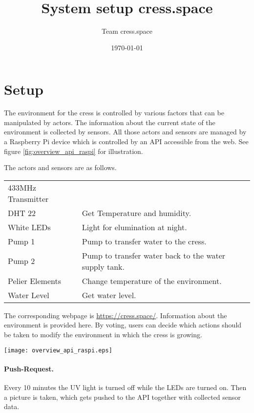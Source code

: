\documentclass[twocolumn,a4wide,parskip,10pt]{scrartcl}
\title{System setup cress.space}
\date{\today}
\author{Team cress.space}
\begin{document}
\maketitle
\setcounter{page}{1}

\section{Setup}

The environment for the cress is controlled by various factors that
can be manipulated by actors. The information about the current state
of the environment is collected by sensors. All those actors and
sensors are managed by a Raspberry Pi device which is controlled by an
API accessible from the web. See figure \ref{fig:overview_api_raspi}
for illustration.

The actors and sensors are as follows.

\begin{tabular}{p{2.5cm}p{4cm}}
  433MHz Transmitter & \\
  DHT 22 & Get Temperature and humidity.\\
  White LEDs & Light for elumination at night.\\
  Pump 1 & Pump to transfer water to the cress.\\
  Pump 2 & Pump to transfer water back to the water supply tank.\\
  Pelier Elements & Change temperature of the environment.\\
  Water Level & Get water level.
\end{tabular}

The corresponding webpage is \url{https://cress.space/}. Information about
the environment is provided here. By voting, users can decide which
actions should be taken to modify the environment in which the cress
is growing.

\begin{figure*}[!h]
  \texttt{[image: overview\_api\_raspi.eps]}
  \label{fig:overview_api_raspi}
  \caption{Setup for cress.space}
\end{figure*}

\paragraph{Push-Request.}

Every 10 minutes the UV light is turned off while the LEDs are turned
on. Then a picture is taken, which gets pushed to the API together
with collected sensor data.
\end{document}
